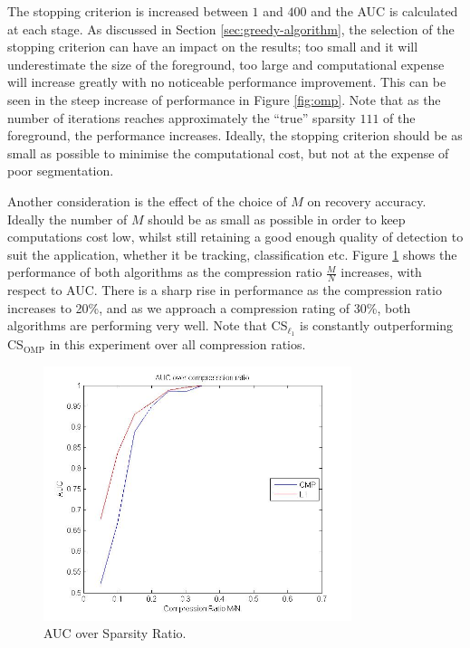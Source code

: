  The stopping criterion is increased between $1$ and $400$ and the AUC is calculated at each stage. As discussed in Section \ref{sec:greedy-algorithm}, the selection of the stopping criterion can have an impact on the results; too small and it will underestimate the size of the foreground, too large and computational expense will increase greatly with no noticeable performance improvement. This can be seen in the steep increase of performance in Figure \ref{fig:omp}. Note that as the number of iterations reaches approximately the ``true'' sparsity $111$ of the foreground, the performance increases. Ideally, the stopping criterion should be as small as possible to minimise the computational cost, but not at the expense of poor segmentation. 

Another consideration is the effect of the choice of $M$ on recovery accuracy. Ideally the number of $M$ should be as small as possible in order to keep computations cost low, whilst still retaining a good enough quality of detection to suit the application, whether it be tracking, classification etc. Figure \ref{fig:sr} shows the performance of both algorithms as the compression ratio $\frac{M}{N}$ increases, with respect to AUC. There is a sharp rise in performance as the compression ratio increases to 20\%, and as we approach a compression rating of 30\%, both algorithms are performing very well. Note that CS$_{\ell_1}$ is constantly outperforming CS$_{\text{OMP}}$ in this experiment over all compression ratios.

\begin{figure}[H]
  \centering
  \includegraphics[width = 9cm]{AUCcompressionRatio}
  \caption{AUC over Sparsity Ratio.}
  \label{fig:sr}
\end{figure}


